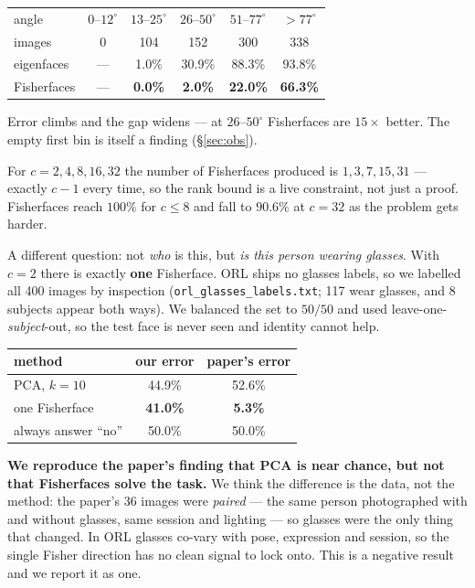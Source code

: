 \documentclass[11pt]{article}
\begin{document}
\begin{description}[leftmargin=1.1em,style=nextline,itemsep=2pt]
\begin{center}\small
\begin{tabular}{lccccc}
\toprule
angle & $0$--$12^\circ$ & $13$--$25^\circ$ & $26$--$50^\circ$ & $51$--$77^\circ$ & $>77^\circ$ \\
images & 0 & 104 & 152 & 300 & 338 \\
\midrule
eigenfaces  & --- & 1.0\% & 30.9\% & 88.3\% & 93.8\% \\
Fisherfaces & --- & \textbf{0.0\%} & \textbf{2.0\%} & \textbf{22.0\%} & \textbf{66.3\%} \\
\bottomrule
\end{tabular}
\end{center}

Error climbs and the gap widens --- at $26$--$50^\circ$ Fisherfaces are
$15\times$ better. The empty first bin is itself a finding (\S\ref{sec:obs}).

\item[E6 --- Sweeping the number of classes (ORL).]
For $c=2,4,8,16,32$ the number of Fisherfaces produced is
$1,3,7,15,31$ --- exactly $c-1$ every time, so the rank bound is a live
constraint, not just a proof. Fisherfaces reach $100\%$ for $c\le8$ and fall to
$90.6\%$ at $c=32$ as the problem gets harder.

\item[E7 --- Glasses / no glasses (ORL), the paper's Section 3.3.]
A different question: not \emph{who} is this, but \emph{is this person wearing
glasses}. With $c=2$ there is exactly \textbf{one} Fisherface. ORL ships no
glasses labels, so we labelled all 400 images by inspection
(\texttt{orl\_glasses\_labels.txt}; 117 wear glasses, and 8 subjects appear
both ways). We balanced the set to $50/50$ and used leave-one-\emph{subject}-out,
so the test face is never seen and identity cannot help.

\begin{center}\small
\begin{tabular}{lcc}
\toprule
method & our error & paper's error \\
\midrule
PCA, $k=10$ & 44.9\% & 52.6\% \\
one Fisherface & \textbf{41.0\%} & \textbf{5.3\%} \\
always answer ``no'' & 50.0\% & 50.0\% \\
\bottomrule
\end{tabular}
\end{center}

\textbf{We reproduce the paper's finding that PCA is near chance, but not that
Fisherfaces solve the task.} We think the difference is the data, not the
method: the paper's 36 images were \emph{paired} --- the same person
photographed with and without glasses, same session and lighting --- so glasses
were the only thing that changed. In ORL glasses co-vary with pose, expression
and session, so the single Fisher direction has no clean signal to lock onto.
This is a negative result and we report it as one.
\end{description}
\end{document}
